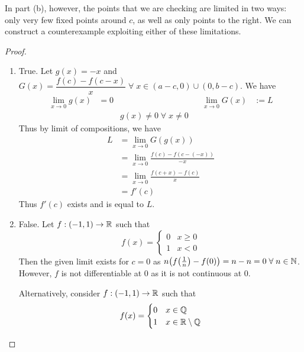 \documentclass[12pt]{article}
\begin{document}
In part (b), however, the points that we are checking are limited in two ways: only very few fixed points around $c$, as well as only points to the right.
We can construct a counterexample exploiting either of these limitations.
\begin{proof}
    \begin{enumerate}[label=(\alph*)]
        \item True. Let $g(x) = -x$ and $G(x) = \dfrac{f(c) - f(c - x)}{x} \;\forall\; x \in (a - c, 0) \cup (0, b - c)$. We have
        \begin{align*}
            \lim_{x \to 0} g(x) &= 0 & & & \lim_{x \to 0} G(x) &:= L \\
            && g(x) \neq 0 \;\forall\; x \neq 0
        \end{align*}
        Thus by limit of compositions, we have
        \begin{align*}
            L &= \lim_{x \to 0} G(g(x)) \\
            &= \lim_{x \to 0} \frac{f(c) - f(c - (-x))}{-x} \\
            &= \lim_{x \to 0} \frac{f(c + x) - f(c)}{x} \\
            &= f'(c)
        \end{align*}
        Thus $f'(c)$ exists and is equal to $L$.
    
        \item False. Let $f: (-1, 1) \to \mathbb{R}$ such that \[
            f(x) = 
            \begin{cases}
                0 & x \geq 0 \\
                1 & x < 0
            \end{cases}
        \] Then the given limit exists for $c = 0$ as $n \paren{f\paren{\frac{1}{n}} - f(0)} = n - n = 0 \;\forall\; n \in \N$.
        However, $f$ is not differentiable at 0 as it is not continuous at 0.
    
        Alternatively, consider $f: (-1, 1) \to \mathbb{R}$ such that \[
            f(x) = 
            \begin{cases}
                0 & x \in \mathbb{Q} \\
                1 & x \in \mathbb{R} \setminus \mathbb{Q}
            \end{cases}
        \]
    \end{enumerate}
\end{proof}
\end{document}
